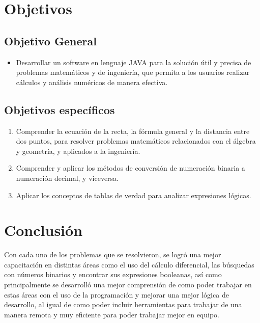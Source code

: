 \documentclass[conference]{IEEEtran}
\begin{document}
\section{Objetivos}
\subsection{Objetivo General}
\begin{itemize}
    \item Desarrollar un software en lenguaje JAVA para la solución útil y precisa de problemas matemáticos y de ingeniería, que permita a los usuarios realizar cálculos y análisis numéricos de manera efectiva.
\end{itemize}

\subsection{Objetivos específicos}
\begin{enumerate}
    \item Comprender la ecuación de la recta, la fórmula general y la distancia entre dos puntos, para resolver problemas matemáticos relacionados con el álgebra y geometría, y aplicados a la ingeniería.
    \item Comprender y aplicar los métodos de conversión de numeración binaria a numeración decimal, y viceversa.
    \item Aplicar los conceptos de tablas de verdad para analizar expresiones lógicas.
\end{enumerate}











 

\clearpage
\section{Conclusión}
Con cada uno de los problemas que se resolvieron, se logró una mejor capacitación en distintas áreas como el uso del cálculo diferencial, las búsquedas con números binarios y encontrar sus expresiones booleanas, así como principalmente se desarrolló una mejor comprensión de como poder trabajar en estas áreas con el uso de la programación y mejorar una mejor lógica de desarrollo, al igual de como poder incluir herramientas para trabajar de una manera remota y muy eficiente para poder trabajar mejor en equipo.
\end{document}
